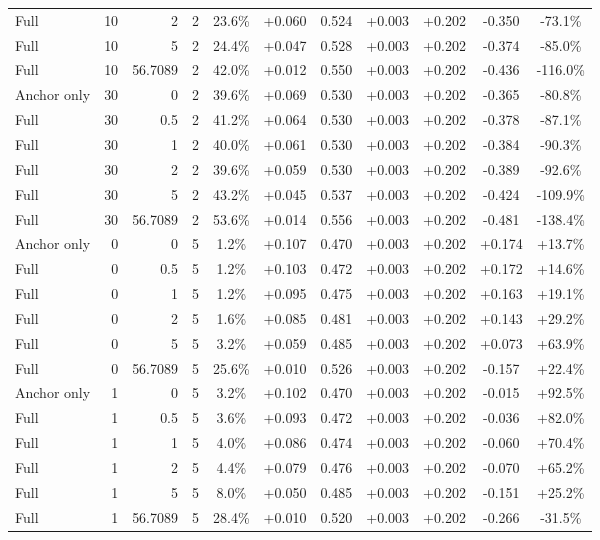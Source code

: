 \begin{table}[htbp]
\begin{tabular}{lrrrccccccc}
Full & 10 & 2 & 2 & 23.6\% & +0.060 & 0.524 & +0.003 & +0.202 & -0.350 & -73.1\% \\
Full & 10 & 5 & 2 & 24.4\% & +0.047 & 0.528 & +0.003 & +0.202 & -0.374 & -85.0\% \\
Full & 10 & 56.7089 & 2 & 42.0\% & +0.012 & 0.550 & +0.003 & +0.202 & -0.436 & -116.0\% \\
Anchor only & 30 & 0 & 2 & 39.6\% & +0.069 & 0.530 & +0.003 & +0.202 & -0.365 & -80.8\% \\
Full & 30 & 0.5 & 2 & 41.2\% & +0.064 & 0.530 & +0.003 & +0.202 & -0.378 & -87.1\% \\
Full & 30 & 1 & 2 & 40.0\% & +0.061 & 0.530 & +0.003 & +0.202 & -0.384 & -90.3\% \\
Full & 30 & 2 & 2 & 39.6\% & +0.059 & 0.530 & +0.003 & +0.202 & -0.389 & -92.6\% \\
Full & 30 & 5 & 2 & 43.2\% & +0.045 & 0.537 & +0.003 & +0.202 & -0.424 & -109.9\% \\
Full & 30 & 56.7089 & 2 & 53.6\% & +0.014 & 0.556 & +0.003 & +0.202 & -0.481 & -138.4\% \\
Anchor only & 0 & 0 & 5 & 1.2\% & +0.107 & 0.470 & +0.003 & +0.202 & +0.174 & +13.7\% \\
Full & 0 & 0.5 & 5 & 1.2\% & +0.103 & 0.472 & +0.003 & +0.202 & +0.172 & +14.6\% \\
Full & 0 & 1 & 5 & 1.2\% & +0.095 & 0.475 & +0.003 & +0.202 & +0.163 & +19.1\% \\
Full & 0 & 2 & 5 & 1.6\% & +0.085 & 0.481 & +0.003 & +0.202 & +0.143 & +29.2\% \\
Full & 0 & 5 & 5 & 3.2\% & +0.059 & 0.485 & +0.003 & +0.202 & +0.073 & +63.9\% \\
Full & 0 & 56.7089 & 5 & 25.6\% & +0.010 & 0.526 & +0.003 & +0.202 & -0.157 & +22.4\% \\
Anchor only & 1 & 0 & 5 & 3.2\% & +0.102 & 0.470 & +0.003 & +0.202 & -0.015 & +92.5\% \\
Full & 1 & 0.5 & 5 & 3.6\% & +0.093 & 0.472 & +0.003 & +0.202 & -0.036 & +82.0\% \\
Full & 1 & 1 & 5 & 4.0\% & +0.086 & 0.474 & +0.003 & +0.202 & -0.060 & +70.4\% \\
Full & 1 & 2 & 5 & 4.4\% & +0.079 & 0.476 & +0.003 & +0.202 & -0.070 & +65.2\% \\
Full & 1 & 5 & 5 & 8.0\% & +0.050 & 0.485 & +0.003 & +0.202 & -0.151 & +25.2\% \\
Full & 1 & 56.7089 & 5 & 28.4\% & +0.010 & 0.520 & +0.003 & +0.202 & -0.266 & -31.5\% \\

\end{tabular}
\end{table}
